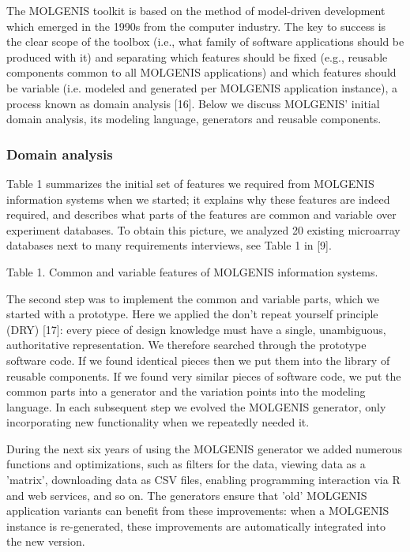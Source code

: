 \documentclass[8pt, twoside, a5paper]{report}
\begin{document}
The MOLGENIS toolkit is based on the method of model-driven development which emerged in the 1990s from the computer industry. 
The key to success is the clear scope of the toolbox (i.e., what family of software applications should be produced with it) 
and separating which features should be fixed (e.g., reusable components common to all MOLGENIS applications) and which 
features should be variable (i.e. modeled and generated per MOLGENIS application instance), a process known as domain 
analysis [16]. Below we discuss MOLGENIS' initial domain analysis, its modeling language, generators and reusable components. 

\subsubsection{Domain analysis}

Table 1 summarizes the initial set of features we required from MOLGENIS information systems when we started; it explains 
why these features are indeed required, and describes what parts of the features are common and variable over experiment 
databases. To obtain this picture, we analyzed 20 existing microarray databases next to many requirements interviews, see 
Table 1 in [9].

Table 1. Common and variable features of MOLGENIS information systems.

The second step was to implement the common and variable parts, which we started with a prototype. Here we applied the 
don't repeat yourself principle (DRY) [17]: every piece of design knowledge must have a single, unambiguous, authoritative 
representation. We therefore searched through the prototype software code. If we found identical pieces then we put them 
into the library of reusable components. If we found very similar pieces of software code, we put the common parts into a 
generator and the variation points into the modeling language. In each subsequent step we evolved the MOLGENIS generator, 
only incorporating new functionality when we repeatedly needed it.

During the next six years of using the MOLGENIS generator we added numerous functions and optimizations, such as filters for 
the data, viewing data as a 'matrix', downloading data as CSV files, enabling programming interaction via R and web services, 
and so on. The generators ensure that 'old' MOLGENIS application variants can benefit from these improvements: when a MOLGENIS 
instance is re-generated, these improvements are automatically integrated into the new version.
\end{document}
